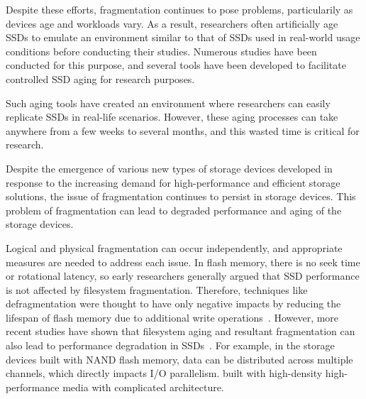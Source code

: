 

%
%
%

Despite these efforts, fragmentation continues to pose problems, particularily as devices age and workloads vary.
As a result, researchers often artificially age SSDs to emulate an environment similar to that of SSDs used in real-world usage conditions before conducting their studies.
Numerous studies have been conducted for this purpose, and several tools have been developed to facilitate controlled SSD aging for research purposes.


Such aging tools have created an environment where researchers can easily replicate SSDs in real-life scenarios.
However, these aging processes can take anywhere from a few weeks to several months, and this wasted time is critical for research.

Despite the emergence of various new types of storage devices developed in response to the increasing demand for high-performance and efficient storage solutions, the issue of fragmentation continues to persist in storage devices.
This problem of fragmentation can lead to degraded performance and aging of the storage devices.


Logical and physical fragmentation can occur independently, and appropriate measures are needed to address each issue.
In flash memory, there is no seek time or rotational latency, so early researchers generally argued that SSD performance is not affected by filesystem fragmentation.
Therefore, techniques like defragmentation were thought to have only negative impacts by reducing the lifespan of flash memory due to additional write operations~\cite{defrag-mobile:atc17,fragpicker:sosp21,defrag-lfs:apsys16,no-afraid:fast24,parallel-defrag:sac22,Defragmentation_read_collision}.
However, more recent studies have shown that filesystem aging and resultant fragmentation can also lead to performance degradation in SSDs~\cite{Problem_in_SSD_Empirical,senescence:fast17,Problem_in_SSD_Mobile_Devices,survey:ictc23}.
For example, in the storage devices built with NAND flash memory, data can be distributed across multiple channels, which directly impacts I/O parallelism.
built with high-density high-performance media with complicated architecture.



